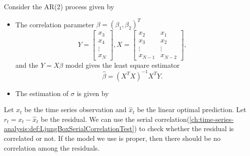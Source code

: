 \begin{example}
	Consider the AR(2) process given by
	
	\begin{itemize}
		\item The correlation parameter $\beta = (\beta_1,\beta_2)^T$ 
		$$Y = \begin{bmatrix}
		x_3\\
		x_4\\
		\vdots\\
		x_N
		\end{bmatrix}, X = \begin{bmatrix}
		x_2 & x_1\\
		x_3 & x_2\\
		\vdots & \vdots\\
		x_{N-1} & x_{N-2}
		\end{bmatrix},$$
		and the $Y = X\beta $ model gives the least square estimator 
		$$\hat{\beta} = (X^TX)^{-1}X^TY.$$
		\item The estimation of $\sigma$ is given by
		
	\end{itemize}	
\end{example}






\begin{remark}
Let $x_t$ be the time series observation and $\hat{x}_t$ be the linear optimal prediction. Let $r_t = x_t - \hat{x}_t$ be the residual. 	
	We can use the serial correlation(\autoref{ch:time-series-analysis:def:LjungBoxSerialCorrelationTest}) to check whether the residual is correlated or not. If the model we use is proper, then there should be no correlation among the residuals.
\end{remark}

